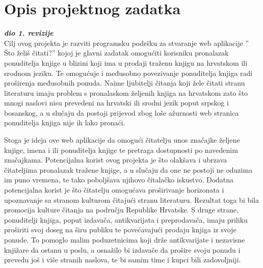\chapter{Opis projektnog zadatka}
		
		\textbf{\textit{dio 1. revizije}}\\
		 Cilj ovog projekta je razviti programsku podršku za stvaranje web aplikacije  ” Što želiš čitati?” kojoj je glavni zadatak omogućiti korisniku pronalazak ponuditelja knjige u blizini koji ima u prodaji traženu knjigu na hrvatskom ili srodnom jeziku. Te omogućuje i međusobno povezivanje ponuditelja knjiga radi proširenja međusobnih ponuda. Naime ljubitelji čitanja koji žele čitati stranu literaturu imaju problem s pronalaskom željenih knjiga na hrvatskom zato što mnogi naslovi nisu prevedeni na hrvatski ili srodni jezik poput srpskog i bosanskog, a u slučaju da postoji prijevod zbog loše ažurnosti web stranica ponuditelja knjiga nije ih lako pronaći.  

        Stoga je ideja ove web aplikacije da omogući čitatelju unos značajke željene knjige, imena i ili ponuditelja knjige te pretraga dostupnosti po navedenim značajkama.  Potencijalna korist ovog projekta je što olakšava i ubrzava čitateljima pronalazak tražene knjige, a u slučaju da one ne postoji ne oduzima im puno vremena, te tako poboljšava njihovo čitalačko iskustvo.  Dodatna potencijalna korist je što čitatelju omogućava proširivanje horizonata i upoznavanje sa stranom kulturom čitajući stranu literaturu. Rezultat toga bi bila promocija kulture čitanja na području Republike Hrvatske. S druge strane, ponuditelji knjiga, poput izdavača, antikvarijata i preprodavača, imaju priliku proširiti svoj doseg na širu publiku te povećavajući prodaju knjiga iz svoje ponude. To pomoglo malim poduzetnicima koji drže antikvarijate i nezavisne knjižare da ostanu u poslu, a osnažilo bi izdavače  da prošire svoju ponudu i prevedu još i više stranih naslova, te bi samim time i kupci bili zadovoljniji. 

